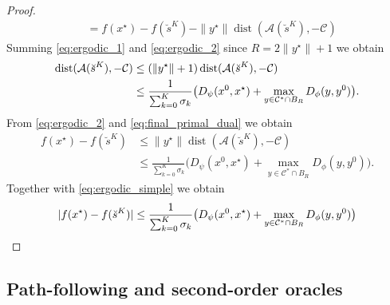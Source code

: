 \documentclass[11pt,onecolumn]{article}
\DeclareMathOperator{\dist}{dist}
\newcommand{\cC}{\mathcal{C}}
\theoremstyle{remark}
\begin{document}
\begin{proof}
\begin{align}
&= f(x^\star)-f(\breve s^K) - \|y^\star\|\dist(\mathcal{A}(\breve s^K),-\cC) \label{eq:ergodic_2}
\end{align}
Summing \cref{eq:ergodic_1} and \cref{eq:ergodic_2} since $R=2\|y^\star\|+1$ we obtain
\begin{align}
\dist(\mathcal{A}(\breve s^K),-\cC) &\leq (\|y^\star\| + 1)\dist(\mathcal{A}(\breve s^K),-\cC) \notag \\
&\leq \frac{1}{\sum_{k=0}^{K} \sigma_k} \big(D_\psi(x^0,x^\star) + \max_{y \in \cC^* \cap B_R} D_\phi(y, y^0)\big) \label{eq:final_primal_dual}.
\end{align}
From \cref{eq:ergodic_2} and \cref{eq:final_primal_dual} we obtain
\begin{align*}
    f(x^\star)-f(\breve s^K) &\leq \|y^\star\| \dist(\mathcal{A}(\breve s^K),-\cC) \\
    &\leq \frac{1}{\sum_{k=0}^{K} \sigma_k} \big(D_\psi(x^0,x^\star) + \max_{y \in \cC^* \cap B_R} D_\phi(y, y^0)\big).
\end{align*}
Together with \cref{eq:ergodic_simple} we obtain
\[
|f(x^\star)-f(\breve s^K)| \leq \frac{1}{\sum_{k=0}^{K} \sigma_k} \big(D_\psi(x^0,x^\star) + \max_{y \in \cC^* \cap B_R} D_\phi(y, y^0)\big) \qedhere
\]
\end{proof}

\subsection{Path-following and second-order oracles}
\end{document}
